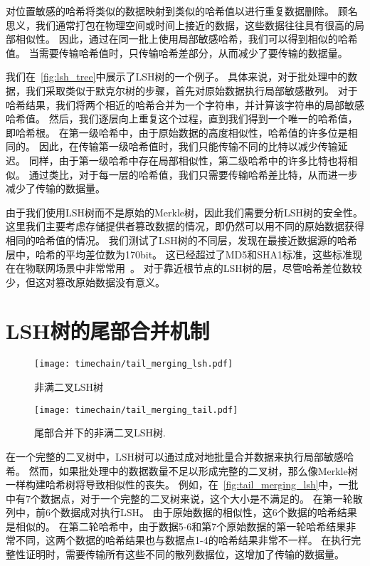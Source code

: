 对位置敏感的哈希将类似的数据映射到类似的哈希值以进行重复数据删除。
顾名思义，我们通常打包在物理空间或时间上接近的数据，这些数据往往具有很高的局部相似性。
因此，通过在同一批上使用局部敏感哈希，我们可以得到相似的哈希值。
当需要传输哈希值时，只传输哈希差部分，从而减少了要传输的数据量。

我们在~\autoref{fig:lsh_tree}中展示了LSH树的一个例子。
具体来说，对于批处理中的数据，我们采取类似于默克尔树的步骤，首先对原始数据执行局部敏感散列。
对于哈希结果，我们将两个相近的哈希合并为一个字符串，并计算该字符串的局部敏感哈希值。
然后，我们逐层向上重复这个过程，直到我们得到一个唯一的哈希值，即哈希根。
在第一级哈希中，由于原始数据的高度相似性，哈希值的许多位是相同的。
因此，在传输第一级哈希值时，我们只能传输不同的比特以减少传输延迟。
同样，由于第一级哈希中存在局部相似性，第二级哈希中的许多比特也将相似。
通过类比，对于每一层的哈希值，我们只需要传输哈希差比特，从而进一步减少了传输的数据量。

由于我们使用LSH树而不是原始的Merkle树，因此我们需要分析LSH树的安全性。
这里我们主要考虑存储提供者篡改数据的情况，即仍然可以用不同的原始数据获得相同的哈希值的情况。
我们测试了LSH树的不同层，发现在最接近数据源的哈希层中，哈希的平均差位数为170bit。
这已经超过了MD5和SHA1标准，这些标准现在在物联网场景中非常常用~\cite{chi2017hashing,landge2018secured}。
对于靠近根节点的LSH树的层，尽管哈希差位数较少，但这对篡改原始数据没有意义。

\section{LSH树的尾部合并机制}

\begin{figure}[t]
    \centering
	\begin{minipage}{0.8\linewidth}
        \centering
        \texttt{[image: timechain/tail\_merging\_lsh.pdf]}
        \caption{非满二叉LSH树}
        \label{fig:tail_merging_lsh}
	\end{minipage}
\end{figure}

\begin{figure}[t]
    \centering
	\begin{minipage}{0.8\linewidth}
        \centering
        \texttt{[image: timechain/tail\_merging\_tail.pdf]}
	\end{minipage}
	\caption{尾部合并下的非满二叉LSH树.}
	\label{fig:tail_merging_tail}
\end{figure}

在一个完整的二叉树中，LSH树可以通过成对地批量合并数据来执行局部敏感哈希。
然而，如果批处理中的数据数量不足以形成完整的二叉树，那么像Merkle树一样构建哈希树将导致相似性的丧失。
例如，在~\autoref{fig:tail_merging_lsh}中，一批中有7个数据点，对于一个完整的二叉树来说，这个大小是不满足的。
在第一轮散列中，前6个数据成对执行LSH。
由于原始数据的相似性，这6个数据的哈希结果是相似的。
在第二轮哈希中，由于数据5-6和第7个原始数据的第一轮哈希结果非常不同，这两个数据的哈希结果也与数据点1-4的哈希结果非常不一样。
在执行完整性证明时，需要传输所有这些不同的散列数据位，这增加了传输的数据量。


